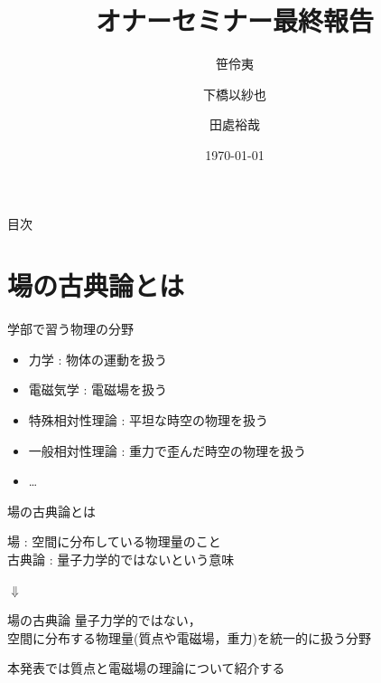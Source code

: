 \documentclass[unicode, aspectratio=169, 12pt]{beamer}
\title{オナーセミナー最終報告}
\author{笹伶夷\and 下橋以紗也\and 田處裕哉}
\institute{大阪大学 理学部 物理学科}
\date{\today}
\begin{document}
\begin{frame}
    \titlepage
\end{frame}


\begin{frame}{目次}
    \tableofcontents
\end{frame}



\section{場の古典論とは}


\begin{frame}{学部で習う物理の分野} %
    \begin{itemize}
        \item 力学 : 物体の運動を扱う
        \item 電磁気学 : 電磁場を扱う
        \item 特殊相対性理論 : 平坦な時空の物理を扱う
        \item 一般相対性理論 : 重力で歪んだ時空の物理を扱う
        \item \dots
    \end{itemize}

\end{frame}


\begin{frame}{場の古典論とは}

    \begin{block}{}
        場 : 空間に分布している物理量のこと\\
        古典論 : 量子力学的ではないという意味
    \end{block}

    \begin{center}
        {\Large $\Downarrow$}
    \end{center}

    \begin{alertblock}{場の古典論}
        量子力学的ではない，\\
        空間に分布する物理量(質点や電磁場，重力)を統一的に扱う分野
    \end{alertblock}

    本発表では質点と電磁場の理論について紹介する

\end{frame}
\end{document}
